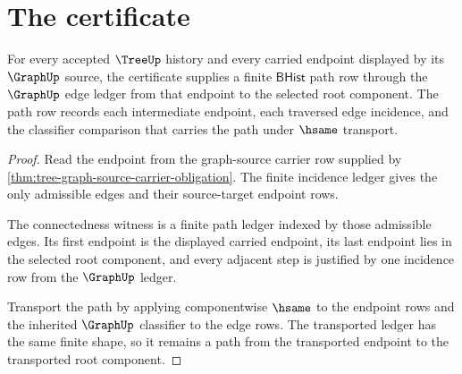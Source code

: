 \section{The certificate}
\label{sec:tree-certificate}

\begin{theorem}
\label{thm:tree-connectedness-obligation}
For every accepted $\TreeUp$ history and every carried endpoint displayed by
its $\GraphUp$ source, the certificate supplies a finite $\mathsf{BHist}$ path
row through the $\GraphUp$ edge ledger from that endpoint to the selected root
component. The path row records each intermediate endpoint, each traversed
edge incidence, and the classifier comparison that carries the path under
$\hsame$ transport.
\end{theorem}
\begin{proof}
Read the endpoint from the graph-source carrier row supplied by
\autoref{thm:tree-graph-source-carrier-obligation}. The finite incidence
ledger gives the only admissible edges and their source-target endpoint rows.

The connectedness witness is a finite path ledger indexed by those admissible
edges. Its first endpoint is the displayed carried endpoint, its last endpoint
lies in the selected root component, and every adjacent step is justified by
one incidence row from the $\GraphUp$ ledger.

Transport the path by applying componentwise $\hsame$ to the endpoint rows and
the inherited $\GraphUp$ classifier to the edge rows. The transported ledger
has the same finite shape, so it remains a path from the transported endpoint
to the transported root component.
\end{proof}

